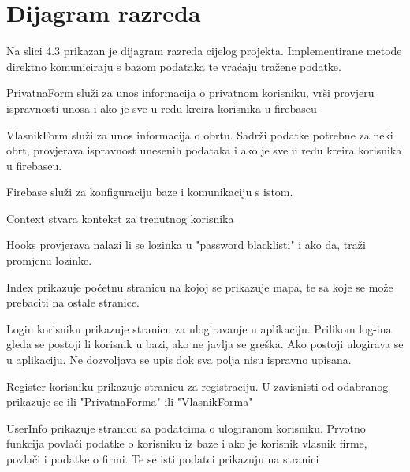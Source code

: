 			\eject
			
		\section{Dijagram razreda}
		
			
			
			Na slici 4.3 prikazan je dijagram razreda cijelog projekta. Implementirane metode direktno komuniciraju s bazom podataka te vraćaju tražene podatke.
			
			PrivatnaForm služi za unos informacija o privatnom korisniku, vrši provjeru ispravnosti unosa i ako je sve u redu kreira korisnika u firebaseu
			
			VlasnikForm služi za unos informacija o obrtu. Sadrži podatke potrebne za neki obrt, provjerava ispravnost unesenih podataka i ako je sve u redu kreira korisnika u firebaseu.
	
	        Firebase služi za konfiguraciju baze i komunikaciju s istom. 
	        
	        Context stvara kontekst za trenutnog korisnika
	        
	        Hooks provjerava nalazi li se lozinka u "password blacklisti" i ako da, traži promjenu lozinke.

            Index prikazuje početnu stranicu na kojoj se prikazuje mapa, te sa koje se može prebaciti na ostale stranice.
            
	        Login korisniku prikazuje stranicu za ulogiravanje u aplikaciju. Prilikom log-ina gleda se postoji li korisnik u bazi, ako ne javlja se greška. Ako postoji ulogirava se u aplikaciju. Ne dozvoljava se upis dok sva polja nisu ispravno upisana.
	        
	        Register korisniku prikazuje stranicu za registraciju. U zavisnisti od odabranog prikazuje se ili "PrivatnaForma" ili "VlasnikForma"
	        
	        UserInfo prikazuje stranicu sa podatcima o ulogiranom korisniku. Prvotno funkcija povlači podatke o korisniku iz baze i ako je korisnik vlasnik firme, povlači i podatke o firmi. Te se isti podatci prikazuju na stranici
	        
